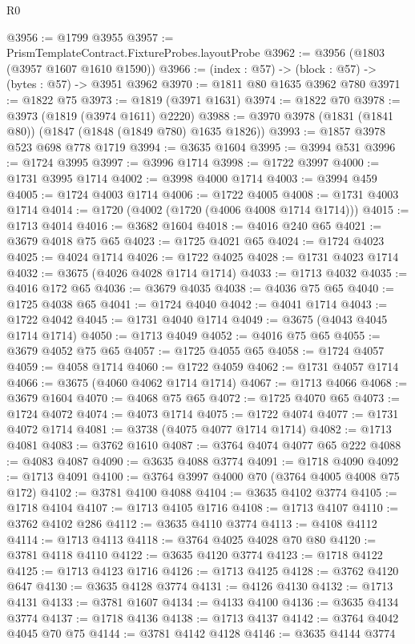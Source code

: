 \begin{lexlean}{R0}
\begin{coremodule}
@3956 := @1799 @3955
@3957 := PrismTemplateContract.FixtureProbes.layoutProbe
@3962 := @3956 (@1803 (@3957 @1607 @1610 @1590))
@3966 := (index : @57) -> (block : @57) -> (bytes : @57) -> @3951 @3962
@3970 := @1811 @80 @1635 @3962 @780
@3971 := @1822 @75
@3973 := @1819 (@3971 @1631)
@3974 := @1822 @70
@3978 := @3973 (@1819 (@3974 @1611) @2220)
@3988 := @3970 @3978 (@1831 (@1841 @80)) (@1847 (@1848 (@1849 @780) @1635 @1826))
@3993 := @1857 @3978 @523 @698 @778 @1719
@3994 := @3635 @1604
@3995 := @3994 @531
@3996 := @1724 @3995
@3997 := @3996 @1714
@3998 := @1722 @3997
@4000 := @1731 @3995 @1714
@4002 := @3998 @4000 @1714
@4003 := @3994 @459
@4005 := @1724 @4003 @1714
@4006 := @1722 @4005
@4008 := @1731 @4003 @1714
@4014 := @1720 (@4002 (@1720 (@4006 @4008 @1714 @1714)))
@4015 := @1713 @4014
@4016 := @3682 @1604
@4018 := @4016 @240 @65
@4021 := @3679 @4018 @75 @65
@4023 := @1725 @4021 @65
@4024 := @1724 @4023
@4025 := @4024 @1714
@4026 := @1722 @4025
@4028 := @1731 @4023 @1714
@4032 := @3675 (@4026 @4028 @1714 @1714)
@4033 := @1713 @4032
@4035 := @4016 @172 @65
@4036 := @3679 @4035
@4038 := @4036 @75 @65
@4040 := @1725 @4038 @65
@4041 := @1724 @4040
@4042 := @4041 @1714
@4043 := @1722 @4042
@4045 := @1731 @4040 @1714
@4049 := @3675 (@4043 @4045 @1714 @1714)
@4050 := @1713 @4049
@4052 := @4016 @75 @65
@4055 := @3679 @4052 @75 @65
@4057 := @1725 @4055 @65
@4058 := @1724 @4057
@4059 := @4058 @1714
@4060 := @1722 @4059
@4062 := @1731 @4057 @1714
@4066 := @3675 (@4060 @4062 @1714 @1714)
@4067 := @1713 @4066
@4068 := @3679 @1604
@4070 := @4068 @75 @65
@4072 := @1725 @4070 @65
@4073 := @1724 @4072
@4074 := @4073 @1714
@4075 := @1722 @4074
@4077 := @1731 @4072 @1714
@4081 := @3738 (@4075 @4077 @1714 @1714)
@4082 := @1713 @4081
@4083 := @3762 @1610
@4087 := @3764 @4074 @4077 @65 @222
@4088 := @4083 @4087
@4090 := @3635 @4088 @3774
@4091 := @1718 @4090
@4092 := @1713 @4091
@4100 := @3764 @3997 @4000 @70 (@3764 @4005 @4008 @75 @172)
@4102 := @3781 @4100 @4088
@4104 := @3635 @4102 @3774
@4105 := @1718 @4104
@4107 := @1713 @4105 @1716
@4108 := @1713 @4107
@4110 := @3762 @4102 @286
@4112 := @3635 @4110 @3774
@4113 := @4108 @4112
@4114 := @1713 @4113
@4118 := @3764 @4025 @4028 @70 @80
@4120 := @3781 @4118 @4110
@4122 := @3635 @4120 @3774
@4123 := @1718 @4122
@4125 := @1713 @4123 @1716
@4126 := @1713 @4125
@4128 := @3762 @4120 @647
@4130 := @3635 @4128 @3774
@4131 := @4126 @4130
@4132 := @1713 @4131
@4133 := @3781 @1607
@4134 := @4133 @4100
@4136 := @3635 @4134 @3774
@4137 := @1718 @4136
@4138 := @1713 @4137
@4142 := @3764 @4042 @4045 @70 @75
@4144 := @3781 @4142 @4128
@4146 := @3635 @4144 @3774

\end{coremodule}
\end{lexlean}
